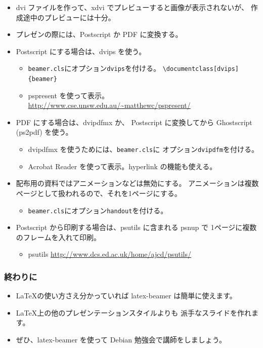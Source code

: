 \documentclass[mingoth,a4paper]{jsarticle}
\begin{document}
\begin{commandline}
\begin{itemize}
\item dvi ファイルを作って、xdvi でプレビューすると画像が表示されないが、
  作成途中のプレビューには十分。
\item プレゼンの際には、Postscript か PDF に変換する。
\item Postscript にする場合は、dvips を使う。
  \begin{itemize}
  \item \texttt{beamer.cls}にオプション\texttt{dvips}を付ける。
    \verb|\documentclass[dvips]{beamer}|
  \item pspresent を使って表示。
    \url{http://www.cse.unsw.edu.au/~matthewc/pspresent/}
  \end{itemize}
\item PDF にする場合は、dvipdfmx か、
  Postscript に変換してから Ghostscript (ps2pdf) を使う。
  \begin{itemize}
  \item dvipdfmx を使うためには、\texttt{beamer.cls}に
    オプション\texttt{dvipdfm}を付ける。
  \item Acrobat Reader を使って表示。hyperlink の機能も使える。
  \end{itemize}
\item 配布用の資料ではアニメーションなどは無効にする。
  アニメーションは複数ページとして扱われるので、それを1ページにする。
  \begin{itemize}
  \item \texttt{beamer.cls}にオプション\texttt{handout}を付ける。
  \end{itemize}
\item Postscript から印刷する場合は、psutils に含まれる
  psnup で 1ページに複数のフレームを入れて印刷。
  \begin{itemize}
  \item psutils
    \url{http://www.dcs.ed.ac.uk/home/ajcd/psutils/}
  \end{itemize}
\end{itemize}


\subsubsection{終わりに}


\begin{itemize}
\item \LaTeX{}の使い方さえ分かっていれば
  latex-beamer は簡単に使えます。
\item \LaTeX{}上の他のプレゼンテーションスタイルよりも
  派手なスライドを作れます。
\item ぜひ、latex-beamer を使って Debian 勉強会で講師をしましょう。
\end{itemize}


\end{commandline}
\end{document}
